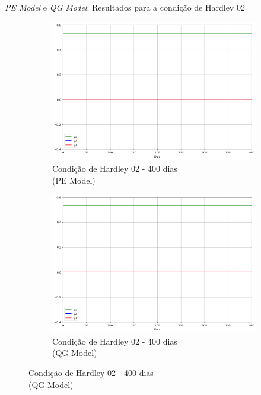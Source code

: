 \begin{frame}{\textit{PE Model} e \textit{QG Model}: Resultados para a condição de Hardley 02}
   \begin{figure}
       \centering
       \begin{subfigure}[b]{0.45\textwidth}
           \centering
           \includegraphics[width=\textwidth]{img/p03d400pe.png}
           \caption{Condição de Hardley 02 - 400 dias\\ (PE Model)}
           \label{fig:p03d400pe}
       \end{subfigure}
       \hfill
       \begin{subfigure}[b]{0.45\textwidth}
           \centering
           \includegraphics[width=\textwidth]{img/p03d400qg.png}
           \caption{Condição de Hardley 02 - 400 dias\\ (QG Model)}
           \label{fig:p03d400qg}
       \end{subfigure}
   \end{figure}
\end{frame}

